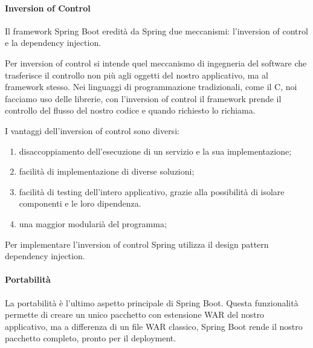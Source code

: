 \paragraph{ Inversion of Control }
Il framework Spring Boot eredità da Spring due meccanismi: l'inversion of control e la dependency injection. 

Per inversion of control si intende quel meccanismo di ingegneria del software che trasferisce il controllo non più agli oggetti del nostro applicativo, ma al framework stesso. Nei linguaggi di programmazione tradizionali, come il C, noi facciamo uso delle librerie, con l'inversion of control il framework prende il controllo del flusso del nostro codice e quando richiesto lo richiama. 

I vantaggi dell'inversion of control sono diversi:
\begin{enumerate}
    \item disaccoppiamento dell'esecuzione di un servizio e la sua implementazione;
    \item facilità di implementazione di diverse soluzioni;
    \item facilità di testing dell'intero applicativo, grazie alla possibilità di isolare componenti e le loro dipendenza.
    \item una maggior modularià del programma;
\end{enumerate}
Per implementare l'inversion of control Spring utilizza il design pattern dependency injection.



\paragraph{Portabilità}
La portabilità è l'ultimo aspetto principale di Spring Boot. Questa funzionalità permette di creare un unico pacchetto con estensione \ac{WAR} del nostro applicativo, ma a differenza di un file WAR classico, Spring Boot rende il nostro pacchetto completo, pronto per il deployment.
